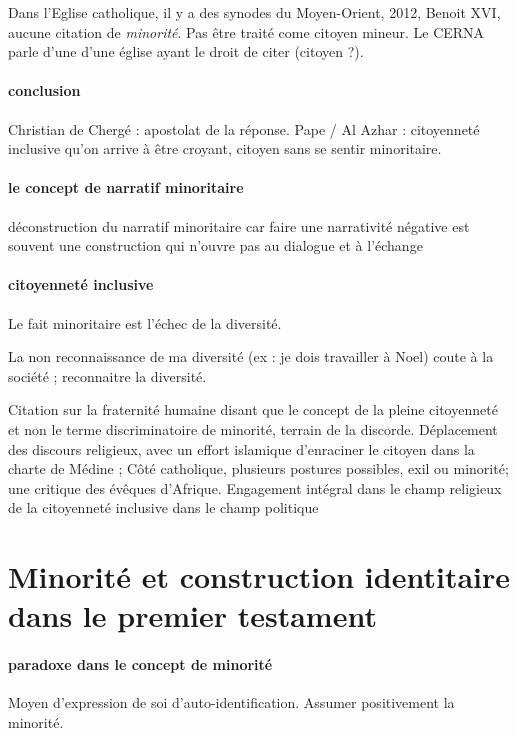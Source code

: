 Dans l’Eglise catholique, il y a des synodes du Moyen-Orient, 2012, Benoit XVI, aucune citation de \textit{minorité}. Pas être traité come citoyen mineur.
Le CERNA parle d’une d’une église ayant le droit de citer (citoyen ?).

\paragraph{conclusion}
Christian de Chergé : apostolat de la réponse. 
Pape / Al Azhar : citoyenneté inclusive qu’on arrive à être croyant, citoyen sans se sentir minoritaire.

\paragraph{le concept de narratif minoritaire}  déconstruction du narratif minoritaire car faire une narrativité négative est souvent une construction qui n’ouvre pas au dialogue et à l’échange 
\paragraph{citoyenneté inclusive} Le fait minoritaire est l’échec de la diversité. 
\begin{Ex}
La non reconnaissance de ma diversité (ex : je dois travailler à Noel)  coute à la société ; reconnaitre la diversité.  
\end{Ex}

\begin{Synthesis}
Citation sur la fraternité humaine disant que le concept de la pleine citoyenneté et non le terme discriminatoire de minorité, terrain de la discorde. Déplacement des discours religieux, avec un effort islamique d’enraciner le citoyen dans la charte de Médine ; Côté catholique, plusieurs postures possibles, exil ou minorité; une critique des évêques d’Afrique.
Engagement intégral dans le champ religieux de la citoyenneté inclusive dans le champ politique
\end{Synthesis}
\section{Minorité et construction identitaire dans le premier testament }
\paragraph{paradoxe dans le concept de minorité} Moyen d’expression de soi d’auto-identification. Assumer positivement la minorité. 

